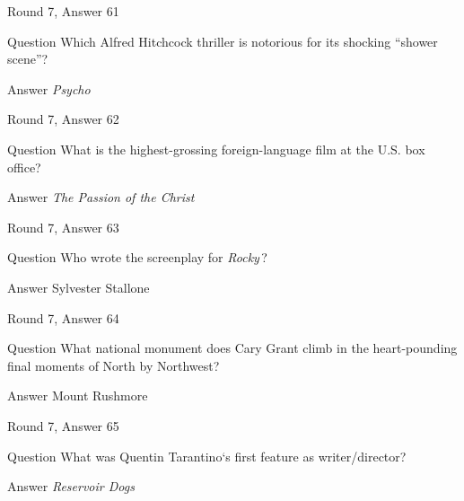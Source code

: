 \documentclass[11pt]{beamer}
\begin{document}
\begin{frame}[t]{Round 7, Answer 61}
\vspace{2em}
\begin{block}{Question}
Which Alfred Hitchcock thriller is notorious for its shocking ``shower scene''?
\end{block}
\pause{}
\begin{block}{Answer}
\emph{Psycho}
\end{block}
\end{frame}
    

\begin{frame}[t]{Round 7, Answer 62}
\vspace{2em}
\begin{block}{Question}
What is the highest-grossing foreign-language film at the U.S. box office?
\end{block}
\pause{}
\begin{block}{Answer}
\emph{The Passion of the Christ}
\end{block}
\end{frame}
    

\begin{frame}[t]{Round 7, Answer 63}
\vspace{2em}
\begin{block}{Question}
Who wrote the screenplay for \emph{Rocky}\,?
\end{block}
\pause{}
\begin{block}{Answer}
Sylvester Stallone
\end{block}
\end{frame}
    

\begin{frame}[t]{Round 7, Answer 64}
\vspace{2em}
\begin{block}{Question}
What national monument does Cary Grant climb in the heart-pounding final moments of North by Northwest?
\end{block}
\pause{}
\begin{block}{Answer}
Mount Rushmore
\end{block}
\end{frame}
    

\begin{frame}[t]{Round 7, Answer 65}
\vspace{2em}
\begin{block}{Question}
What was Quentin Tarantino`s first feature as writer/director?
\end{block}
\pause{}
\begin{block}{Answer}
\emph{Reservoir Dogs}
\end{block}
\end{frame}
    
\end{document}
